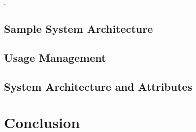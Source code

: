 \documentclass[times, 10pt,twocolumn]{article}
\begin{document}

\cite{Emr:Web:Jade,Emr:Web:Fipa}.
\cite{KoLaMaMi:04,SaShUe:04}

\subsection{Sample System Architecture}

\subsection{Usage Management}
 

\subsection{System Architecture and Attributes}

\section{Conclusion}



\end{document}
